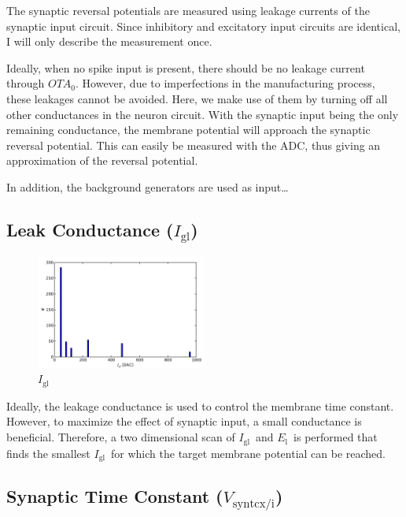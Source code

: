 \documentclass[12pt,a4paper,bibliography=totocnumbered,listof=totocnumbered, DIV12]{scrartcl}
\newcommand{\el}{\ensuremath{E_{\text{l}}}}
\newcommand{\igl}{\ensuremath{I_{\text{gl}}}}
\newcommand{\vsyntc}{\ensuremath{V_{\text{syntcx/i}}}}
\begin{document}
The synaptic reversal potentials are measured using leakage currents of the synaptic input circuit.
Since inhibitory and excitatory input circuits are identical, I will only describe the measurement once.

Ideally, when no spike input is present, there should be no leakage current through $OTA_0$.
However, due to imperfections in the manufacturing process, these leakages cannot be avoided.
Here, we make use of them by turning off all other conductances in the neuron circuit.
With the synaptic input being the only remaining conductance, the membrane potential will approach the synaptic reversal potential.
This can easily be measured with the ADC, thus giving an approximation of the reversal potential.

In addition, the background generators are used as input\ldots

\subsection{Leak Conductance (\igl)}

\begin{figure}
  \centering
  \includegraphics[width=0.5\textwidth]{figures/hist_I_gl}
  \caption{\igl}
  \label{fig:igl}
\end{figure}

Ideally, the leakage conductance is used to control the membrane time
constant. However, to maximize the effect of synaptic input, a small
conductance is beneficial. Therefore, a two dimensional scan of
\igl\ and \el\ is performed that finds the smallest
\igl\ for which the target membrane potential can be reached.


\subsection{Synaptic Time Constant (\vsyntc)}
\end{document}
